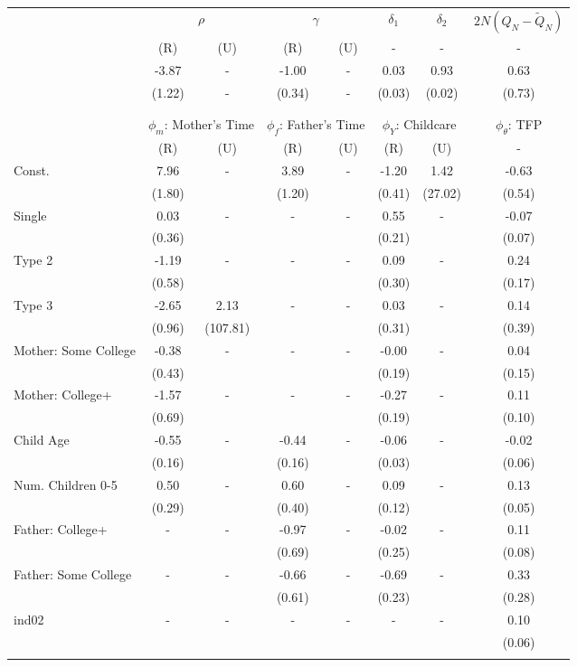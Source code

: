 \begin{tabular}{lccccccc}\toprule
 & \multicolumn{2}{c}{$\rho$} & \multicolumn{2}{c}{$\gamma$} & {$\delta_{1}$} & {$\delta_{2}$} & $2N(Q_{N} - \tilde{Q}_{N})$ \\
 & (R) & (U) & (R) & (U) & - & - & - \\\cmidrule(r){2-3}\cmidrule(r){4-5}\cmidrule(r){6-6}\cmidrule(r){7-7}\cmidrule(r){8-8}
&-3.87& - &-1.00& - &0.03&0.93&0.63\\
&(1.22)& - &(0.34)& - &(0.03)&(0.02)&(0.73)\\
\\
&&&&&&&\\
 & \multicolumn{2}{c}{$\phi_{m}$: Mother's Time} & \multicolumn{2}{c}{$\phi_{f}$: Father's Time} & \multicolumn{2}{c}{$\phi_{Y}$: Childcare} &{$\phi_{\theta}$: TFP} \\
 & (R) & (U) & (R) & (U) & (R) & (U) & -  \\\cmidrule(r){2-3}\cmidrule(r){4-5}\cmidrule(r){6-7}\cmidrule(r){8-8}
Const.&7.96& -&3.89& -&-1.20&1.42&-0.63\\
&(1.80)&&(1.20)&&(0.41)&(27.02)&(0.54)\\
Single&0.03& -& - & -&0.55& -&-0.07\\
&(0.36)& & &&(0.21)&&(0.07)\\
Type 2&-1.19& -& - & -&0.09& -&0.24\\
&(0.58)& & &&(0.30)&&(0.17)\\
Type 3&-2.65&2.13& - & -&0.03& -&0.14\\
&(0.96)&(107.81) & &&(0.31)&&(0.39)\\
Mother: Some College&-0.38& -& - & -&-0.00& -&0.04\\
&(0.43)& & &&(0.19)&&(0.15)\\
Mother: College+&-1.57& -& - & -&-0.27& -&0.11\\
&(0.69)& & &&(0.19)&&(0.10)\\
Child Age&-0.55& -&-0.44& -&-0.06& -&-0.02\\
&(0.16)&&(0.16)&&(0.03)&&(0.06)\\
Num. Children 0-5&0.50& -&0.60& -&0.09& -&0.13\\
&(0.29)&&(0.40)&&(0.12)&&(0.05)\\
Father: College+& - & -&-0.97& -&-0.02& -&0.11\\
 & &&(0.69)&&(0.25)&&(0.08)\\
Father: Some College& - & -&-0.66& -&-0.69& -&0.33\\
 & &&(0.61)&&(0.23)&&(0.28)\\
ind02& - & -& - & -& - & -&0.10\\
 & & & & & &&(0.06)\\
\\
\bottomrule\end{tabular}